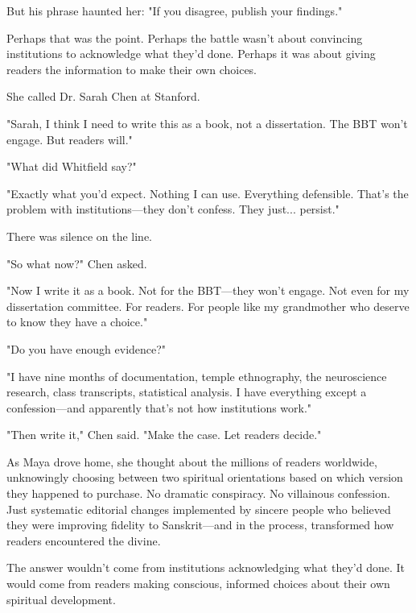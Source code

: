 \documentclass[12pt]{article}
\begin{document}
But his phrase haunted her: "If you disagree, publish your findings."

Perhaps that was the point. Perhaps the battle wasn't about convincing institutions to acknowledge what they'd done. Perhaps it was about giving readers the information to make their own choices.

She called Dr. Sarah Chen at Stanford.

"Sarah, I think I need to write this as a book, not a dissertation. The BBT won't engage. But readers will."

"What did Whitfield say?"

"Exactly what you'd expect. Nothing I can use. Everything defensible. That's the problem with institutions—they don't confess. They just... persist."

There was silence on the line.

"So what now?" Chen asked.

"Now I write it as a book. Not for the BBT—they won't engage. Not even for my dissertation committee. For readers. For people like my grandmother who deserve to know they have a choice."

"Do you have enough evidence?"

"I have nine months of documentation, temple ethnography, the neuroscience research, class transcripts, statistical analysis. I have everything except a confession—and apparently that's not how institutions work."

"Then write it," Chen said. "Make the case. Let readers decide."

As Maya drove home, she thought about the millions of readers worldwide, unknowingly choosing between two spiritual orientations based on which version they happened to purchase. No dramatic conspiracy. No villainous confession. Just systematic editorial changes implemented by sincere people who believed they were improving fidelity to Sanskrit—and in the process, transformed how readers encountered the divine.

The answer wouldn't come from institutions acknowledging what they'd done. It would come from readers making conscious, informed choices about their own spiritual development.
\end{document}

